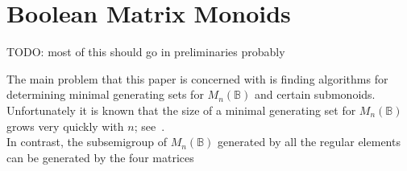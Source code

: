 \documentclass[11pt]{article}
\numberwithin{equation}{section}
\newcommand{\B}{\mathbb{B}}
\newcommand{\Bn}{M_n(\B)}
\begin{document}


\section{Boolean Matrix Monoids}
TODO: most of this should go in preliminaries probably

The main problem that this paper is concerned with is finding algorithms for
determining minimal generating sets for $\Bn$ and certain submonoids.
Unfortunately it is known that the size of a minimal generating set for $\Bn$
grows very quickly with $n$; see~.\\

In contrast, the subsemigroup of $\Bn$ generated by all the regular elements can
be generated by the four matrices \cite{Roush1977aa}
\end{document}
